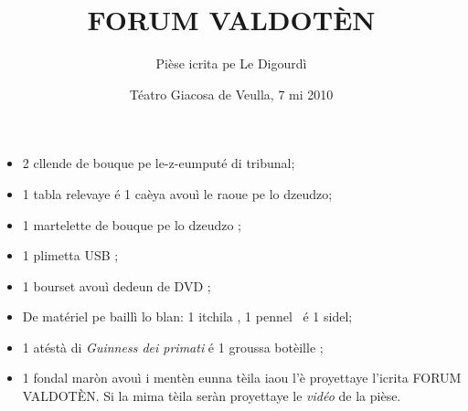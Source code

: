 \title{FORUM VALDOT\`EN}
\author{Pièse icrita pe Le Digourdì}
\date{Téatro Giacosa de Veulla, 7 mi 2010}

\maketitle






\Scenographie
\begin{itemize}
\item[$\bullet$] 2 cllende de bouque pe le-z-eumputé di tribunal;
\item[$\bullet$] 1 tabla relevaye é 1 caèya avouì le raoue pe lo dzeudzo;
\item[$\bullet$] 1 martelette de bouque pe lo dzeudzo \martelloGiudice ;
\item[$\bullet$] 1 plimetta USB \usb ;
\item[$\bullet$] 1 bourset avouì dedeun de DVD \dvd ;
\item[$\bullet$] De matériel pe baillì lo blan: 1 itchila \scala , 1 pennel \pennello\ é 1 sidel;
\item[$\bullet$] 1 atéstà di \textit{Guinness dei primati} é 1 groussa botèille \bigBottle ;
\item[$\bullet$] 1 fondal maròn avouì i mentèn eunna tèila iaou l'è proyettaye l'icrita \og FORUM VALDOT\`EN\fg. Si la mima tèila seràn proyettaye le \textit{vidéo} de la pièse.
\end{itemize}

\setlength{\lengthchar}{3.5cm}




